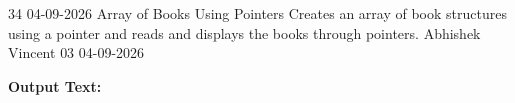 \clearpage
\label{prog:34}
\programhead
  {34}
  {04-09-2026}
  {Array of Books Using Pointers}
  {Creates an array of book structures using a pointer and reads and displays the books through pointers.}
  {Abhishek Vincent}
  {03}
  {04-09-2026}

\divider
\textbf{Output Text:}\par
\vspace{2pt}

